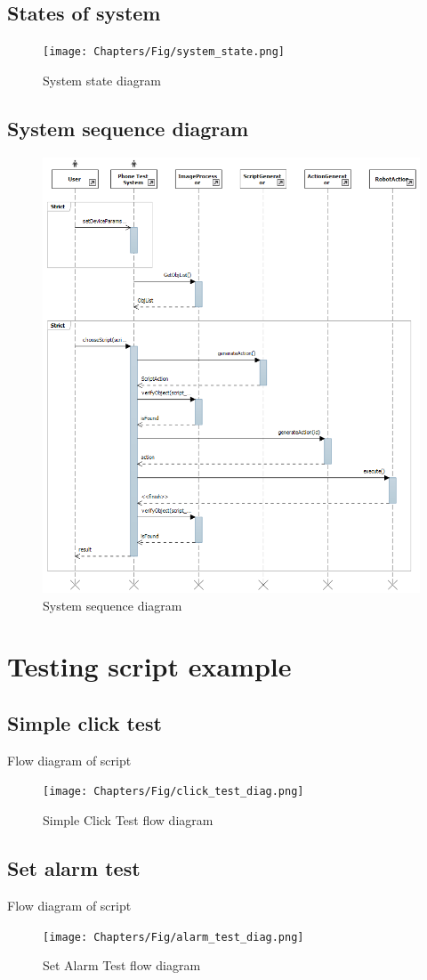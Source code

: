 \subsection{States of system}
    \begin{figure}[H]
		\centering
		\texttt{[image: Chapters/Fig/system\_state.png]}
		\caption{System state diagram}
		\label{fig:system_state}
	\end{figure}


\subsection{System sequence diagram}
    \begin{figure}[H]
		\centering
		\includegraphics[scale=0.75]{Chapters/Fig/sequence_diagram.png}
		\caption{System sequence diagram}
		\label{fig:sequence_diagram}
	\end{figure}

\section{Testing script example}
\subsection{Simple click test}
Flow diagram of script
	\begin{figure}[H]
		\centering
		\texttt{[image: Chapters/Fig/click\_test\_diag.png]}
		\caption{Simple Click Test flow diagram}
		\label{fig:click_test_diag}
	\end{figure}

\subsection{Set alarm test}
Flow diagram of script
	\begin{figure}[H]
		\centering
		\texttt{[image: Chapters/Fig/alarm\_test\_diag.png]}
		\caption{Set Alarm Test flow diagram}
		\label{fig:alarm_test_diag}
	\end{figure}
